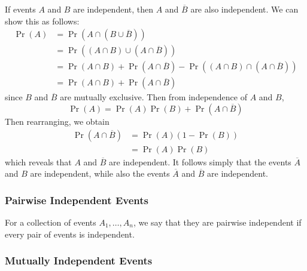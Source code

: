\documentclass[11pt]{report} %
\begin{document}
If events $A$ and $B$ are independent, then $A$ and $\overline{B}$ are also independent. We can show this as follows:
\begin{align}
\operatorname{Pr}\left(A\right) &= \operatorname{Pr}\left(A \cap \left(B \cup \overline{B}\right)\right) \\
&= \operatorname{Pr}\left(\left(A \cap B\right) \cup \left(A \cap \overline{B}\right)\right) \\
&= \operatorname{Pr}\left(A \cap B\right) + \operatorname{Pr}\left(A \cap \overline{B}\right) - \operatorname{Pr}\left(\left(A \cap B\right) \cap \left(A \cap \overline{B}\right)\right) \\
&= \operatorname{Pr}\left(A \cap B\right) + \operatorname{Pr}\left(A \cap \overline{B}\right)
\end{align}
since $B$ and $\overline{B}$ are mutually exclusive. Then from independence of $A$ and $B$,
\begin{equation}
\operatorname{Pr}\left(A\right) = \operatorname{Pr}\left(A\right)\operatorname{Pr}\left(B\right) + \operatorname{Pr}\left(A \cap \overline{B}\right)
\end{equation}
Then rearranging, we obtain
\begin{align}
\operatorname{Pr}\left(A \cap \overline{B}\right) &= \operatorname{Pr}\left(A\right)\left(1 - \operatorname{Pr}\left(B\right)\right) \\
&= \operatorname{Pr}\left(A\right)\operatorname{Pr}\left(B\right)
\end{align}
which reveals that $A$ and $\overline{B}$ are independent. It follows simply that the events $\overline{A}$ and $B$ are independent, while also the events $\overline{A}$ and $\overline{B}$ are independent.

\subsubsection{Pairwise Independent Events}

For a collection of events $A_{1}, \dots, A_{n}$, we say that they are pairwise independent if every pair of events is independent.

\subsubsection{Mutually Independent Events}
\end{document}
